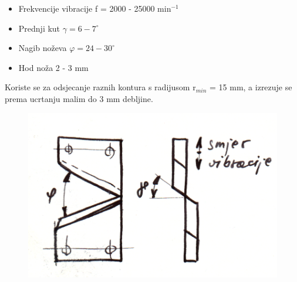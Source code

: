 \documentclass[a4paper,12pt]{article}
\numberwithin{figure}{section}
\begin{document}
\begin{enumerate}
\begin{itemize}
\item Frekvencije vibracije f = 2000 - 25000 min$^{-1}$
\item Prednji kut $\gamma = 6 -7^{\circ}$
\item Nagib noževa $\varphi = 24 - 30 ^{\circ}$
\item Hod noža 2 - 3 mm
\end{itemize}
Koriste se za odsjecanje raznih kontura s radijusom r$_{min}$ = 15 mm, a izrezuje se prema ucrtanju malim do 3 mm debljine.
\begin{figure}[!h]
\centering
\includegraphics[scale=0.2]{image_55-3.png}
\end{figure}
\FloatBarrier
\end{enumerate}
\end{document}
